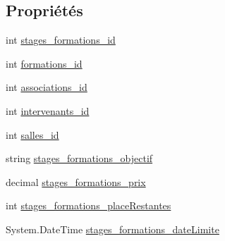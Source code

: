 \subsection*{Propriétés}
\begin{DoxyCompactItemize}
\item 
int \hyperlink{classforma_1_1formadb_data_set_1_1stages__formations_row_a0539e5ee656dacdd6f110426f2388df8}{stages\+\_\+formations\+\_\+id}
\item 
int \hyperlink{classforma_1_1formadb_data_set_1_1stages__formations_row_a34fd2d87e3b26d81941d15d792b04cec}{formations\+\_\+id}
\item 
int \hyperlink{classforma_1_1formadb_data_set_1_1stages__formations_row_aa64ec223e0f412b154f775b8186ec074}{associations\+\_\+id}
\item 
int \hyperlink{classforma_1_1formadb_data_set_1_1stages__formations_row_ac86129e575d726fe7454ec34ccf75f0c}{intervenants\+\_\+id}
\item 
int \hyperlink{classforma_1_1formadb_data_set_1_1stages__formations_row_a31a678ae275267913e547cd32f917f1c}{salles\+\_\+id}
\item 
string \hyperlink{classforma_1_1formadb_data_set_1_1stages__formations_row_ac32e576991a3fe713f834b7fa0b8d573}{stages\+\_\+formations\+\_\+objectif}
\item 
decimal \hyperlink{classforma_1_1formadb_data_set_1_1stages__formations_row_a99e91b9a5a2a7e8a96a15722d2f5aadb}{stages\+\_\+formations\+\_\+prix}
\item 
int \hyperlink{classforma_1_1formadb_data_set_1_1stages__formations_row_abae9e53121e4211d6a9b4dd1cdcaa3e6}{stages\+\_\+formations\+\_\+place\+Restantes}
\item 
System.\+Date\+Time \hyperlink{classforma_1_1formadb_data_set_1_1stages__formations_row_ac58965802a5cf131efcfb72c02e537fc}{stages\+\_\+formations\+\_\+date\+Limite}
\end{DoxyCompactItemize}


